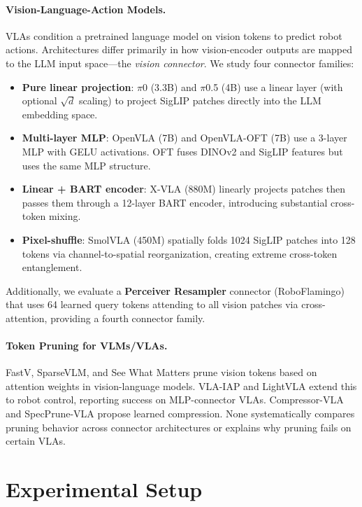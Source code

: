 \documentclass[10pt,letterpaper]{article}
\begin{document}
\paragraph{Vision-Language-Action Models.}
VLAs condition a pretrained language model on vision tokens to predict robot actions. Architectures differ primarily in how vision-encoder outputs are mapped to the LLM input space---the \emph{vision connector}. We study four connector families:
\begin{itemize}
\item \textbf{Pure linear projection}: $\pi$0 (3.3B) and $\pi$0.5 (4B) use a linear layer (with optional $\sqrt{d}$ scaling) to project SigLIP patches directly into the LLM embedding space.
\item \textbf{Multi-layer MLP}: OpenVLA (7B) and OpenVLA-OFT (7B) use a 3-layer MLP with GELU activations. OFT fuses DINOv2 and SigLIP features but uses the same MLP structure.
\item \textbf{Linear + BART encoder}: X-VLA (880M) linearly projects patches then passes them through a 12-layer BART encoder, introducing substantial cross-token mixing.
\item \textbf{Pixel-shuffle}: SmolVLA (450M) spatially folds 1024 SigLIP patches into 128 tokens via channel-to-spatial reorganization, creating extreme cross-token entanglement.
\end{itemize}

Additionally, we evaluate a \textbf{Perceiver Resampler} connector (RoboFlamingo) that uses 64 learned query tokens attending to all vision patches via cross-attention, providing a fourth connector family.

\paragraph{Token Pruning for VLMs/VLAs.}
FastV, SparseVLM, and See What Matters prune vision tokens based on attention weights in vision-language models. VLA-IAP and LightVLA extend this to robot control, reporting success on MLP-connector VLAs. Compressor-VLA and SpecPrune-VLA propose learned compression. None systematically compares pruning behavior across connector architectures or explains why pruning fails on certain VLAs.


\section{Experimental Setup}
\label{sec:setup}
\end{document}
